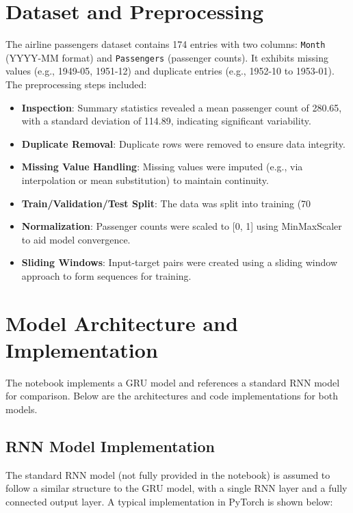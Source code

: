 \documentclass{article}
\begin{document}
\section{Dataset and Preprocessing}
The airline passengers dataset contains 174 entries with two columns: \texttt{Month} (YYYY-MM format) and \texttt{Passengers} (passenger counts). It exhibits missing values (e.g., 1949-05, 1951-12) and duplicate entries (e.g., 1952-10 to 1953-01). The preprocessing steps included:
\begin{itemize}
    \item \textbf{Inspection}: Summary statistics revealed a mean passenger count of 280.65, with a standard deviation of 114.89, indicating significant variability.
    \item \textbf{Duplicate Removal}: Duplicate rows were removed to ensure data integrity.
    \item \textbf{Missing Value Handling}: Missing values were imputed (e.g., via interpolation or mean substitution) to maintain continuity.
    \item \textbf{Train/Validation/Test Split}: The data was split into training (70%
    \item \textbf{Normalization}: Passenger counts were scaled to [0, 1] using MinMaxScaler to aid model convergence.
    \item \textbf{Sliding Windows}: Input-target pairs were created using a sliding window approach to form sequences for training.
\end{itemize}

\section{Model Architecture and Implementation}
The notebook implements a GRU model and references a standard RNN model for comparison. Below are the architectures and code implementations for both models.

\subsection{RNN Model Implementation}
The standard RNN model (not fully provided in the notebook) is assumed to follow a similar structure to the GRU model, with a single RNN layer and a fully connected output layer. A typical implementation in PyTorch is shown below:
\end{document}
